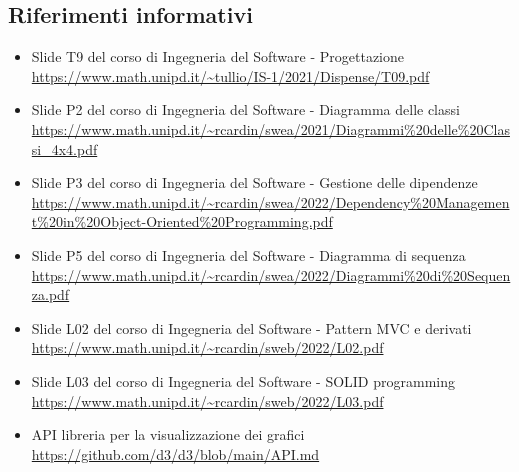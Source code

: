 \subsection{Riferimenti informativi}
\begin{itemize}
    \item Slide T9 del corso di Ingegneria del Software - Progettazione \\
    \url{https://www.math.unipd.it/~tullio/IS-1/2021/Dispense/T09.pdf}
    \item Slide P2 del corso di Ingegneria del Software - Diagramma delle classi \\
    \url{https://www.math.unipd.it/~rcardin/swea/2021/Diagrammi%20delle%20Classi_4x4.pdf}
    \item Slide P3 del corso di Ingegneria del Software - Gestione delle dipendenze \\
    \url{https://www.math.unipd.it/~rcardin/swea/2022/Dependency%20Management%20in%20Object-Oriented%20Programming.pdf}
    \item Slide P5 del corso di Ingegneria del Software - Diagramma di sequenza \\
    \url{https://www.math.unipd.it/~rcardin/swea/2022/Diagrammi%20di%20Sequenza.pdf}
    \item Slide L02 del corso di Ingegneria del Software - Pattern MVC e derivati \\
    \url{https://www.math.unipd.it/~rcardin/sweb/2022/L02.pdf}
    \item Slide L03 del corso di Ingegneria del Software - SOLID programming \\
    \url{https://www.math.unipd.it/~rcardin/sweb/2022/L03.pdf}
    \item API libreria per la visualizzazione dei grafici
    \url{https://github.com/d3/d3/blob/main/API.md}
\end{itemize}
